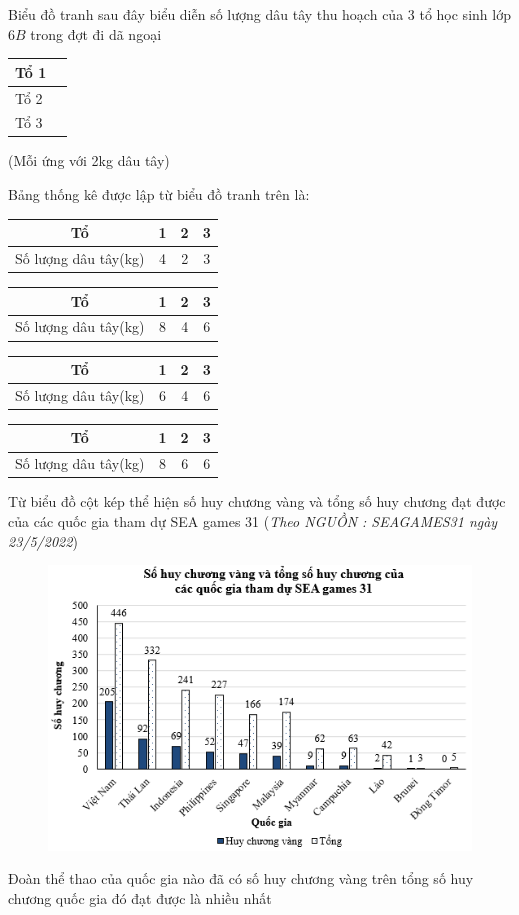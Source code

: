 \begin{ex}
	Biểu đồ tranh sau đây biểu diễn số lượng dâu tây thu hoạch của 3 tổ học sinh lớp $6B$ trong đợt đi dã ngoại
	\begin{center}
		\begin{tabular}{|l|l|}
			\hline
			Tổ 1 & \\
			\hline
			Tổ 2 & \\
			\hline
			Tổ 3 & \\
			\hline
		\end{tabular}
	
	\vspace*{5pt}
	(Mỗi ứng với 2kg dâu tây)
	\end{center}
	Bảng thống kê được lập từ biểu đồ tranh trên là: 
	\choice
	{\begin{tabular}{|c|c|c|c|}
			\hline
			Tổ & 1&2&3\\
			\hline
			Số lượng dâu tây(kg) & 4&2&3\\
			\hline
	\end{tabular}}
	{\begin{tabular}{|c|c|c|c|}
			\hline
			Tổ & 1&2&3\\
			\hline
			Số lượng dâu tây(kg) & 8&4&6\\
			\hline
	\end{tabular}}
	{\begin{tabular}{|c|c|c|c|}
			\hline
			Tổ & 1&2&3\\
			\hline
			Số lượng dâu tây(kg) & 6&4&6\\
			\hline
	\end{tabular}}
	{\begin{tabular}{|c|c|c|c|}
			\hline
			Tổ & 1&2&3\\
			\hline
			Số lượng dâu tây(kg) & 8&6&6\\
			\hline
	\end{tabular}} 
\end{ex}
\begin{ex}
	Từ biểu đồ cột kép thể hiện số huy chương vàng và tổng số huy chương đạt được của các quốc gia tham dự SEA games 31 (\textit{Theo NGUỒN : SEAGAMES31 ngày 23/5/2022})
	\begin{figure}[H]
		\centering
		\vspace*{-5pt}
		\captionsetup{labelformat= empty, justification=centering}
		\includegraphics[width=0.5\linewidth]{20}
		\vspace*{-10pt}
	\end{figure}
	Đoàn thể thao của quốc gia nào đã có số huy chương vàng trên tổng số huy chương quốc gia đó đạt được là nhiều nhất
\end{ex}
